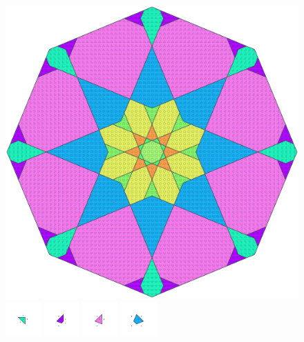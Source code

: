 \documentclass[text.tex]{subfiles}
\begin{document}
\clearpage
\pagestyle{fancy}
\fancyhf{}
\begin{figure}[h!]
\centering
\includegraphics[width=1\textwidth]{img/results/octagon/octagon_185355_(5_1alpha_4).pdf}
\includegraphics[width=0.12\textwidth]{img/results/octagon/octagon_185355_(5_1alpha_4)_001.pdf}
\includegraphics[width=0.12\textwidth]{img/results/octagon/octagon_185355_(5_1alpha_4)_002.pdf}
\includegraphics[width=0.12\textwidth]{img/results/octagon/octagon_185355_(5_1alpha_4)_003.pdf}
\includegraphics[width=0.12\textwidth]{img/results/octagon/octagon_185355_(5_1alpha_4)_004.pdf}

\end{figure}
\end{document}
